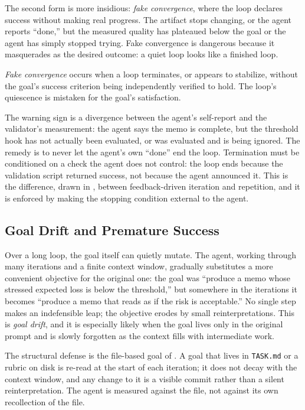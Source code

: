 The second form is more insidious: \emph{fake convergence}, where the loop
declares success without making real progress. The artifact stops changing, or
the agent reports ``done,'' but the measured quality has plateaued below the goal
or the agent has simply stopped trying. Fake convergence is dangerous because it
masquerades as the desired outcome: a quiet loop looks like a finished loop.

\begin{definition}\label{def:fake-convergence}
\emph{Fake convergence} occurs when a loop terminates, or appears to stabilize,
without the goal's success criterion being independently verified to hold. The
loop's quiescence is mistaken for the goal's satisfaction.
\end{definition}

The warning sign is a divergence between the agent's self-report and the
validator's measurement: the agent says the memo is complete, but the
threshold hook has not actually been evaluated, or was evaluated and is being
ignored. The remedy is to never let the agent's own ``done'' end the loop.
Termination must be conditioned on a check the agent does not control: the loop
ends because the validation script returned success, not because the agent
announced it. This is the difference, drawn in ,
between feedback-driven iteration and repetition, and it is enforced by making
the stopping condition external to the agent.

\subsection{Goal Drift and Premature Success}\label{subsec:goal-drift-premature}

Over a long loop, the goal itself can quietly mutate. The agent, working through
many iterations and a finite context window, gradually substitutes a more
convenient objective for the original one: the goal was ``produce a memo whose
stressed expected loss is below the threshold,'' but somewhere in the iterations
it becomes ``produce a memo that reads as if the risk is acceptable.'' No single
step makes an indefensible leap; the objective erodes by small reinterpretations.
This is \emph{goal drift}, and it is especially likely when the goal lives only
in the original prompt and is slowly forgotten as the context fills with
intermediate work.

The structural defense is the file-based goal of . A
goal that lives in \texttt{TASK.md} or a rubric on disk is re-read at the start
of each iteration; it does not decay with the context window, and any change to
it is a visible commit rather than a silent reinterpretation. The agent is
measured against the file, not against its own recollection of the file.

